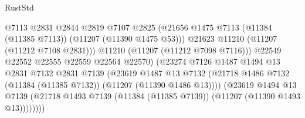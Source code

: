 \begin{lexlean}{RustStd}
\begin{coremodule}
                                              @7113
                                              @2831
                                              @2844
                                              @2819
                                              @7107
                                              @2825
                                              (@21656
                                                @1475
                                                @7113
                                                (@11384 (@11385 @7113))
                                                (@11207 (@11390 @1475 @53)))
                                              @21623
                                              @11210
                                              (@11207 (@11212 @7108 @2831)))
                                            @11210
                                            (@11207 (@11212 @7098 @7116)))
                                          @22549
                                          @22552
                                          @22555
                                          @22559
                                          @22564
                                          @22570)
                                        (@23274
                                          @7126
                                          @1487
                                          @1494
                                          @13
                                          @2831
                                          @7132
                                          @2831
                                          @7139
                                          (@23619
                                            @1487
                                            @13
                                            @7132
                                            (@21718
                                              @1486
                                              @7132
                                              (@11384 (@11385 @7132))
                                              (@11207 (@11390 @1486 @13))))
                                          (@23619
                                            @1494
                                            @13
                                            @7139
                                            (@21718
                                              @1493
                                              @7139
                                              (@11384 (@11385 @7139))
                                              (@11207 (@11390 @1493 @13))))))))

\end{coremodule}
\end{lexlean}
